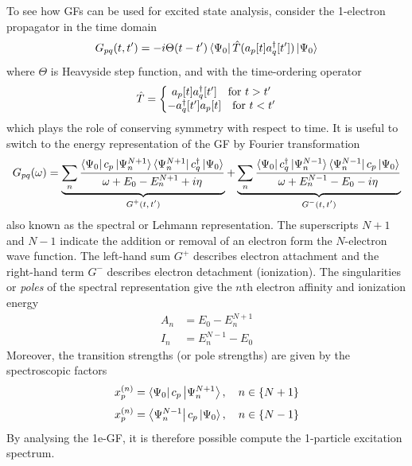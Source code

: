 To see how GFs can be used for excited state analysis, consider the 1-electron propagator in the time domain
\begin{equation}
G_{pq}(t,t') = - i\Theta(t-t') \bra{\smash{\Psi_0}} \hat{T}(a_p[t]a
_q^{\dagger}[t']) \ket{\smash{\Psi_0}}
\end{equation}
\noindent where $\Theta$ is Heavyside step function, and with the time-ordering operator 
\begin{equation}
\hat{T} = \left\lbrace \begin{matrix}
a_p[t] a_q^{\dagger}[t'] \quad \textrm{for } t > t' \\
-a_q^{\dagger}[t'] a_p[t] \quad \textrm{for } t < t'
\end{matrix}
\right.
\end{equation}
\noindent which plays the role of conserving symmetry with respect to time. It is useful to switch to the energy representation of the GF by Fourier transformation
\begin{equation}
G_{pq} (\omega) = \underbrace{ \sum_n \frac{
	\bra{\smash{\Psi_0}} c_p \ket{\smash{\Psi_n^{N+1}}}			    \bra{\smash{\Psi_n^{N+1}}} c_q ^{\dagger} \ket{\smash{\Psi_0}} 
}{
	\omega + E_0 - E_n^{N+1} + i \eta
}
}_{\text{$G^{+}(t,t')$}} + 
\underbrace{
\sum_n \frac{
	\bra{\smash{\Psi_0}} c_q ^{\dagger} \ket{\smash{\Psi_n^{N-1}}}			    \bra{\smash{\Psi_n^{N-1}}} c_p \ket{\smash{\Psi_0}}
}{
	\omega + E_n^{N-1} - E_0 - i \eta
}
}_{\text{$G^{-}(t,t')$}}
\end{equation}
\noindent also known as the spectral or Lehmann representation. The superscripts $N+1$ and $N-1$ indicate the addition or removal of an electron form the $N$-electron wave function. The left-hand sum $G^{+}$ describes electron attachment and the right-hand term $G^{-}$ describes electron detachment (ionization). The singularities or \emph{poles} of the spectral representation give the $n$th electron affinity and ionization energy 
\begin{align}
A_n &= E_0 - E_n^{N+1} \\
I_n &= E_n^{N-1} - E_0
\end{align}
\noindent Moreover, the transition strengths (or pole strengths) are given by the spectroscopic factors 
\begin{equation}
x_p^{(n)} = \bra{\Psi_0 } c_p \ket{\Psi_n ^{N+1} }, \quad n \in \left\lbrace N + 1 \right\rbrace
\end{equation}
\begin{equation}
x_p^{(n)} = \bra{\Psi_n^{N-1} } c_p \ket{\Psi_0 }, \quad n \in \left\lbrace N - 1 \right\rbrace
\end{equation}
\noindent By analysing the 1e-GF, it is therefore possible compute the 1-particle excitation spectrum. 


